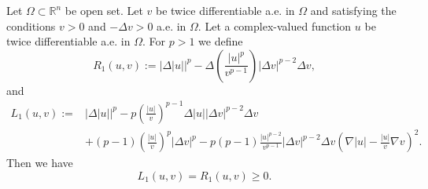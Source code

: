 \documentclass[10pt,a4paper]{amsart}
\begin{document}
\begin{lem}\label{lem_Piceone-R}
	Let $\Omega \subset \mathbb{R}^n$ be open set. Let $v$ be twice differentiable a.e. in $\Omega$ and satisfying the conditions $v >0$ and $-\Delta v >0$ a.e. in $\Omega$. Let a complex-valued function $u$ be twice differentiable a.e. in $\Omega$. For $p>1$ we define
	\begin{equation}
	R_1(u,v):= |\Delta |u||^p - \Delta\left( \frac{|u|^p}{v^{p-1}} \right) |\Delta v|^{p-2} \Delta v, 
	\end{equation}
	and 
	\begin{align}
	L_1(u,v):= &|\Delta |u||^p - p \left(\frac{|u|}{v}\right)^{p-1} \Delta |u| |\Delta v|^{p-2} \Delta v \\
	& + (p-1)\left( \frac{|u|}{v}\right)^p |\Delta v|^p  - p(p-1)\frac{|u|^{p-2}}{v^{p-1}} |\Delta v|^{p-2} \Delta v \left( \nabla |u| - \frac{|u|}{v} \nabla v\right)^2. \nonumber
	\end{align}
	Then we have 
	\begin{equation}
	L_1(u,v)=R_1(u,v) \geq 0.
	\end{equation}
\end{lem}
\end{document}
